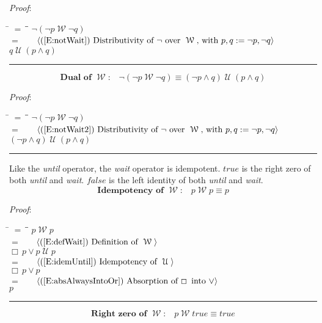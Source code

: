 \documentclass[12pt, fleqn, leqno]{article}
\newcommand{\lgap}{2pt}                             %
\newcommand{\mymathindent}{24pt}                    %
\newcommand{\Until}{\;\mathcal{U}\;}
\newcommand{\Wait}{\;\mathcal{W}\;}
\newcommand{\Always}{\Box\,}
\newcommand{\myqed}{\rule[-.23ex]{1.2ex}{2.0ex}}
\newcommand{\myqedtab}{\hspace{384pt}}              %
\newcommand{\Gll} {\langle}                         %
\newcommand{\Ggg} {\rangle}                         %
\newcommand{\Hint}[1]     {\ \ \ $\Gll              \mbox{#1} \Ggg$ }   %
\begin{document}
\emph{Proof}:
\begin{tabbing}
\hspace{\mymathindent} \= $= \;$ \= \myqedtab \= \kill
\> \> $\neg (\neg p \Wait \neg q)$\\[\lgap]
\> $=$ \> \Hint{(\ref{E:notWait}) Distributivity of $\neg$ over $\Wait$, with $p,q := \neg p, \neg q$} \\[\lgap]
\> \> $q \Until (p \land q)$ \quad \myqed
\end{tabbing}
\begin{equation}\label{E:DualWait2}
\textbf{Dual of $\Wait$:}\quad \neg (\neg p \Wait \neg q) \equiv (\neg p \land q) \Until (p \land q)
\end{equation}

\emph{Proof}:
\begin{tabbing}
\hspace{\mymathindent} \= $= \;$ \= \myqedtab \= \kill
\> \> $\neg (\neg p \Wait \neg q)$\\[\lgap]
\> $=$ \> \Hint{(\ref{E:notWait2}) Distributivity of $\neg$ over $\Wait$, with $p,q := \neg p, \neg q$} \\[\lgap]
\> \> $(\neg p \land q) \Until (p \land q)$ \quad \myqed
\end{tabbing}

Like the \textit{until} operator, the \textit{wait} operator is idempotent.
$true$ is the right zero of both \textit{until} and \textit{wait}.
$false$ is the left identity of both \textit{until} and \textit{wait}.
\begin{equation}\label{E:idempWait}
\textbf{Idempotency of $\Wait$:}\quad p \Wait p \equiv p
\end{equation}

\emph{Proof}:
\begin{tabbing}
\hspace{\mymathindent} \= $= \;$ \= \myqedtab \= \kill
\> \> $p \Wait p$\\[\lgap]
\> $=$ \> \Hint{(\ref{E:defWait}) Definition of $\Wait$} \\[\lgap]
\> \> $\Always p \lor p\Until p$\\[\lgap]
\> $=$ \> \Hint{(\ref{E:idemUntil}) Idempotency of $\Until$} \\[\lgap]
\> \> $\Always p \lor p$\\[\lgap]
\> $=$ \> \Hint{(\ref{E:absAlwaysIntoOr}) Absorption of $\Always$ into $\lor$}\\[\lgap]
\> \> $p$ \quad \myqed
\end{tabbing}
\begin{equation}\label{E:rightZeroWait}
\textbf{Right zero of $\Wait$:}\quad p \Wait true \equiv true
\end{equation}
\end{document}
